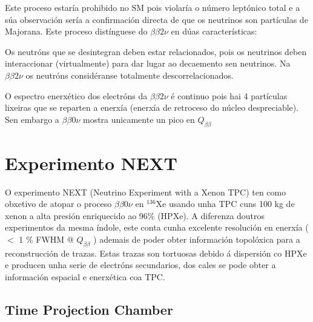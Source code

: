 \documentclass[a4paper,12pt]{article}
\newcommand{\bbcn}[0]{$\beta\beta0\nu$ }
\newcommand{\bbdn}[0]{$\beta\beta2\nu$ }
\begin{document}
Este proceso estaría prohibido no SM pois violaría o número leptónico total e a súa observación sería a confirmación directa de que os neutrinos son partículas de Majorana. Este proceso distínguese do \bbdn en dúas características:

\bi
\item Os neutróns que se desintegran deben estar relacionados, pois os neutrinos deben interaccionar (virtualmente) para dar lugar ao decaemento sen neutrinos. Na \bbdn os neutróns considéranse totalmente descorrelacionados. \newpage
\item O espectro enerxético dos electróns da \bbdn é continuo pois hai 4 partículas lixeiras que se reparten a enerxía (enerxía de retroceso do núcleo despreciable). Sen embargo a \bbcn mostra unicamente un pico en $Q_{\beta\beta}$ %

\ei

\section{Experimento NEXT}\label{NEXT}%

O experimento NEXT (Neutrino Experiment with a Xenon TPC) ten como obxetivo de atopar o proceso \bbcn en $^{136}$Xe usando unha TPC cuns 100 kg de xenon a alta presión enriquecido ao 96\% (HPXe). A diferenza doutros experimentos da mesma índole, este conta cunha excelente resolución en enerxía ( $<$ 1 \% FWHM @ $Q_{\beta\beta}$ ) ademais de poder obter información topolóxica para a reconstrucción de trazas. Estas trazas son tortuosas debido á dispersión co HPXe e producen unha serie de electróns secundarios, dos cales se pode obter a información espacial e enerxética coa TPC.

\subsection{Time Projection Chamber}\label{TPC}
\end{document}
